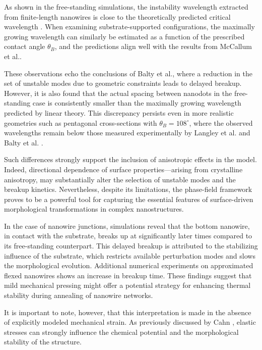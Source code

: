 As shown in the free-standing simulations, the instability wavelength extracted from finite-length nanowires is close to the theoretically predicted critical wavelength \cite{Nichols1976}. When examining substrate-supported configurations, the maximally growing wavelength can similarly be estimated as a function of the prescribed contact angle $\theta_B$, and the predictions align well with the results from McCallum et al.\cite{McCallumVoorheesMiksisDavisWong1996}. 

These observations echo the conclusions of Balty et al., where a reduction in the set of unstable modes due to geometric constraints leads to delayed breakup. However, it is also found that the actual spacing between nanodots in the free-standing case is consistently smaller than the maximally growing wavelength predicted by linear theory. This discrepancy persists even in more realistic geometries such as pentagonal cross-sections with $\theta_B = 108^\circ$, where the observed wavelengths remain below those measured experimentally by Langley et al. \cite{LangleyGiustiMayousseCelleBelletSimonato2013} and Balty et al. \cite{BaltyBaretSilhanekNguyen2024}.

Such differences strongly support the inclusion of anisotropic effects in the model. Indeed, directional dependence of surface properties—arising from crystalline anisotropy, may substantially alter the selection of unstable modes and the breakup kinetics.
Nevertheless, despite its limitations, the phase-field framework proves to be a powerful tool for capturing the essential features of surface-driven morphological transformations in complex nanostructures.

In the case of nanowire junctions, simulations reveal that the bottom nanowire, in contact with the substrate, breaks up at significantly later times compared to its free-standing counterpart. This delayed breakup is attributed to the stabilizing influence of the substrate, which restricts available perturbation modes and slows the morphological evolution. Additional numerical experiments on approximated flexed nanowires shows an increase in breakup time. These findings suggest that mild mechanical pressing might offer a potential strategy for enhancing thermal stability during annealing of nanowire networks.

It is important to note, however, that this interpretation is made in the absence of explicitly modeled mechanical strain. As previously discussed by Cahn \cite{Cahn1961}, elastic stresses can strongly influence the chemical potential and the morphological stability of the structure.